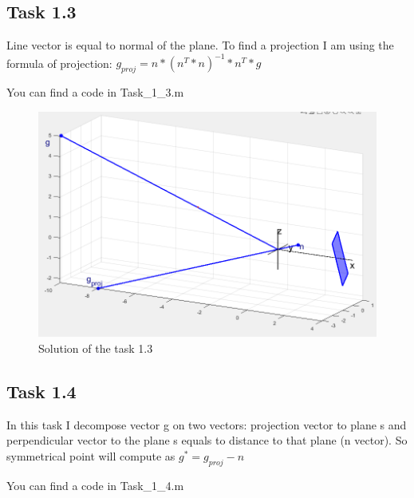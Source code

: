 \documentclass[12pt]{article}
\begin{document}
\subsection{Task 1.3}
Line vector is equal to normal of the plane. To find a projection I am using the formula of projection: $g_{proj} = n * (n^T * n)^{-1} * n^T * g$

You can find a code in Task\string_1\string_3.m

\begin{figure}[h]
    \centering
    \includegraphics[scale=0.35]{Task_1_3.png}
    \caption{Solution of the task 1.3}
    \label{fig:my_label}
\end{figure}

\subsection{Task 1.4}
In this task I decompose vector g on two vectors: projection vector to plane s and perpendicular vector to the plane s equals to distance to that plane (n vector). So symmetrical point will compute as $g^* = g_{proj} - n$

You can find a code in Task\string_1\string_4.m
\end{document}
